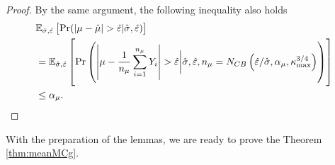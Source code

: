 \documentclass{iitthesis}
\newtheorem{lemma}[theorem]{Lemma}
\theoremstyle{definition}
\begin{document}
\begin{proof}
By the same argument, the following inequality also holds
\begin{align}\label{fixedwidthintervalrandomheps}
&\mathbb{E}_{\hat{\sigma},\hat{\varepsilon}}\left[\Pr({\left \lvert \mu-\hat{\mu} \right \rvert >\hat{\varepsilon}}| \hat{\sigma} , \hat{\varepsilon})\right]\\
&= \mathbb{E}_{\hat{\sigma},\hat{\varepsilon}}\left[\Pr\left({\left \lvert \mu-\frac{1}{n_\mu}\sum_{i=1}^{n_\mu}Y_i \right \rvert >\hat{\varepsilon}}\bigg \vert \hat{\sigma} , \hat{\varepsilon}, n_\mu= N_{CB}\left(\hat{\varepsilon}/\hat{\sigma},\alpha_\mu, \kappa_{\max}^{3/4}\right)\right)\right]\\
&\leq \alpha_\mu.
\end{align}
\end{proof}
With the preparation of the lemmas, we are ready to prove the Theorem \ref{thm:meanMCg}.
\end{document}
